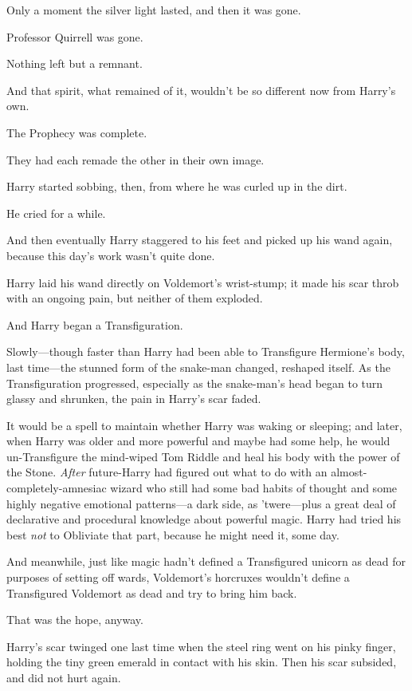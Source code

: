 Only a moment the silver light lasted, and then it was gone.

Professor Quirrell was gone.

Nothing left but a remnant.

And that spirit, what remained of it, wouldn't be so different now from Harry's own.

The Prophecy was complete.

They had each remade the other in their own image.

Harry started sobbing, then, from where he was curled up in the dirt.

He cried for a while.

And then eventually Harry staggered to his feet and picked up his wand again, because this day's work wasn't quite done.

\later

Harry laid his wand directly on Voldemort's wrist-stump; it made his scar throb with an ongoing pain, but neither of them exploded.

And Harry began a Transfiguration.

Slowly—though faster than Harry had been able to Transfigure Hermione's body, last time—the stunned form of the snake-man changed, reshaped itself. As the Transfiguration progressed, especially as the snake-man's head began to turn glassy and shrunken, the pain in Harry's scar faded.

It would be a spell to maintain whether Harry was waking or sleeping; and later, when Harry was older and more powerful and maybe had some help, he would un-Transfigure the mind-wiped Tom Riddle and heal his body with the power of the Stone. \emph{After} future-Harry had figured out what to do with an almost-completely-amnesiac wizard who still had some bad habits of thought and some highly negative emotional patterns—a dark side, as 'twere—plus a great deal of declarative and procedural knowledge about powerful magic. Harry had tried his best \emph{not} to Obliviate that part, because he might need it, some day.

And meanwhile, just like magic hadn't defined a Transfigured unicorn as dead for purposes of setting off wards, Voldemort's horcruxes wouldn't define a Transfigured Voldemort as dead and try to bring him back.

That was the hope, anyway.

Harry's scar twinged one last time when the steel ring went on his pinky finger, holding the tiny green emerald in contact with his skin. Then his scar subsided, and did not hurt again.

